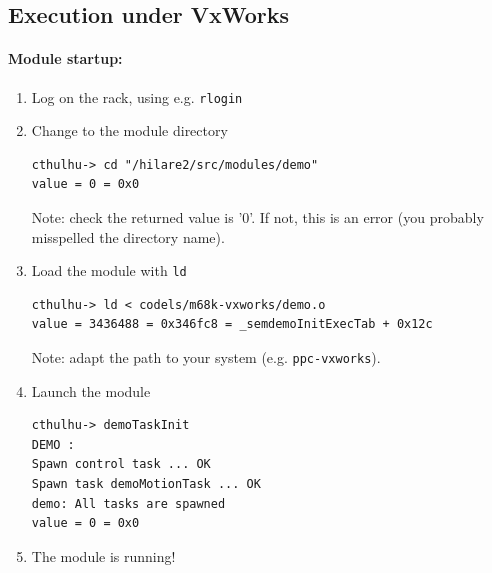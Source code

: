 \subsection{Execution under VxWorks}
\label{ssec|exec|vxworks}

\paragraph{Module startup:}

\begin{enumerate}
\item Log on the rack, using e.g. {\tt rlogin}
\item Change to the module directory

\begin{center}\begin{cartouche}\small\begin{verbatim}
cthulhu-> cd "/hilare2/src/modules/demo"
value = 0 = 0x0
\end{verbatim}\end{cartouche}\end{center}

Note: check the returned   value is '0'.  If  not, this is an  error (you
probably misspelled the directory name).

\item Load the module with {\tt ld}

\begin{center}\begin{cartouche}\small\begin{verbatim}
cthulhu-> ld < codels/m68k-vxworks/demo.o
value = 3436488 = 0x346fc8 = _semdemoInitExecTab + 0x12c
\end{verbatim}\end{cartouche}\end{center}

Note: adapt the path to your system (e.g. {\tt ppc-vxworks}).

\item Launch the module

\begin{center}\begin{cartouche}\small\begin{verbatim}
cthulhu-> demoTaskInit
DEMO :
Spawn control task ... OK
Spawn task demoMotionTask ... OK
demo: All tasks are spawned
value = 0 = 0x0
\end{verbatim}\end{cartouche}\end{center}

\item The module is running!
\end{enumerate}

